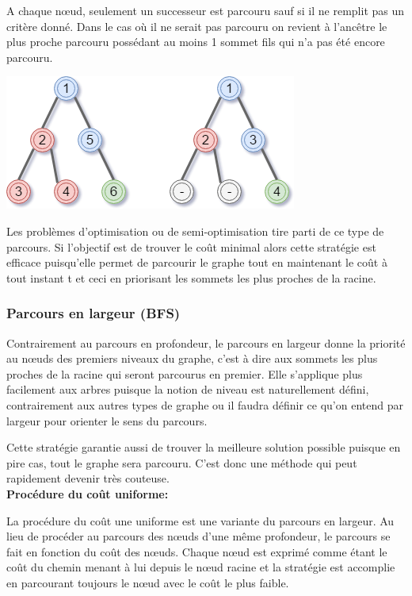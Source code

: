 A chaque nœud, seulement un successeur est parcouru sauf si il ne remplit pas un critère donné. Dans le cas où il ne serait pas parcouru on revient à l'ancêtre le plus proche parcouru possédant au moins 1 sommet fils qui n'a pas été encore parcouru.

\begin{center}
    \includegraphics[scale=0.6]{../ressources/images/depth_first_search.png}
\end{center}

Les problèmes d'optimisation ou de semi-optimisation tire parti de ce type de parcours. Si l'objectif est de trouver le coût minimal alors cette stratégie est efficace puisqu'elle permet de parcourir le graphe tout en maintenant le coût à tout instant t et ceci en priorisant les sommets les plus proches de la racine.

\subsubsection{Parcours en largeur (BFS)}
Contrairement au parcours en profondeur, le parcours en largeur donne la priorité au nœuds des premiers niveaux du graphe, c'est à dire aux sommets les plus proches de la racine qui seront parcourus en premier. Elle s'applique plus facilement aux arbres puisque la notion de niveau est naturellement défini, contrairement aux autres types de graphe ou il faudra définir ce qu'on entend par largeur pour orienter le sens du parcours.

Cette stratégie garantie aussi de trouver la meilleure solution possible puisque en pire cas, tout le graphe sera parcouru. C'est donc une méthode qui peut rapidement devenir très couteuse.\\

{\setlength{\parindent}{0cm}\textbf{Procédure du coût uniforme:}}

La procédure du coût une uniforme est une variante du parcours en largeur. Au lieu de procéder au parcours des nœuds d'une même profondeur, le parcours se fait en fonction du coût des nœuds. Chaque nœud est exprimé comme étant le coût du chemin menant à lui depuis le nœud racine et la stratégie est accomplie en parcourant toujours le nœud avec le coût le plus faible.

